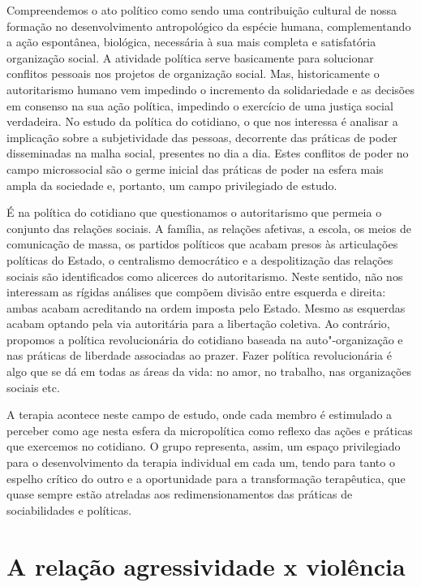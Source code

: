 Compreendemos o ato político como sendo uma contribuição cultural de
nossa formação no desenvolvimento antropológico da espécie humana,
complementando a ação espontânea, biológica, necessária à sua mais
completa e satisfatória organização social. A atividade política serve
basicamente para solucionar conflitos pessoais nos projetos de
organização social. Mas, historicamente o autoritarismo humano vem
impedindo o incremento da solidariedade e as decisões em consenso na sua
ação política, impedindo o exercício de uma justiça social verdadeira.
No estudo da política do cotidiano, o que nos interessa é analisar a
implicação sobre a subjetividade das pessoas, decorrente das práticas de
poder disseminadas na malha social, presentes no dia a dia. Estes
conflitos de poder no campo microssocial são o germe inicial das práticas
de poder na esfera mais ampla da sociedade e, portanto, um campo
privilegiado de estudo.

É na política do cotidiano que questionamos o autoritarismo que permeia
o conjunto das relações sociais. A família, as relações afetivas, a
escola, os meios de comunicação de massa, os partidos políticos que
acabam presos às articulações políticas do Estado, o centralismo
democrático e a despolitização das relações sociais são identificados
como alicerces do autoritarismo. Neste sentido, não nos interessam as
rígidas análises que compõem divisão entre esquerda e direita: ambas
acabam acreditando na ordem imposta pelo Estado. Mesmo as esquerdas
acabam optando pela via autoritária para a libertação coletiva. Ao
contrário, propomos a política revolucionária do cotidiano baseada na
auto"-organização e nas práticas de liberdade associadas ao prazer. Fazer
política revolucionária é algo que se dá em todas as áreas da vida: no
amor, no trabalho, nas organizações sociais etc.

A terapia acontece neste campo de estudo, onde cada membro é estimulado
a perceber como age nesta esfera da micropolítica como reflexo das
ações e práticas que exercemos no cotidiano. O grupo representa, assim,
um espaço privilegiado para o desenvolvimento da terapia individual em
cada um, tendo para tanto o espelho crítico do outro e a oportunidade
para a transformação terapêutica, que quase sempre estão atreladas aos
redimensionamentos das práticas de sociabilidades e políticas.

\section{A relação agressividade x violência}

